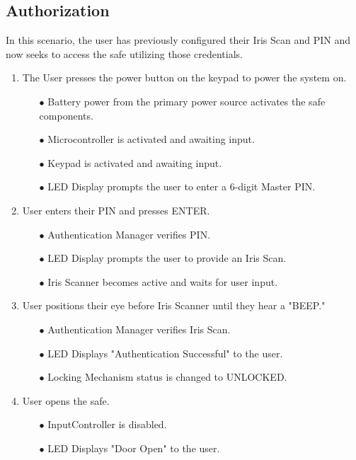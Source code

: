\documentclass{article}
\begin{document}
\subsection{Authorization}
In this scenario, the user has previously configured their Iris Scan and PIN and now seeks to access the safe utilizing those credentials.

\begin{enumerate}
    \item The User presses the power button on the keypad to power the system on.
    \begin{enumerate}
        \item[$\bullet$] Battery power from the primary power source activates the safe components.
        \item[$\bullet$] Microcontroller is activated and awaiting input.
        \item[$\bullet$] Keypad is activated and awaiting input.
        \item[$\bullet$] LED Display prompts the user to enter a 6-digit Master PIN.
    \end{enumerate}
    \item User enters their PIN and presses ENTER.
    \begin{enumerate}
        \item[$\bullet$] Authentication Manager verifies PIN.
        \item[$\bullet$] LED Display prompts the user to provide an Iris Scan.
        \item[$\bullet$] Iris Scanner becomes active and waits for user input.
    \end{enumerate}
    \item User positions their eye before Iris Scanner until they hear a "BEEP."
    \begin{enumerate}
        \item[$\bullet$] Authentication Manager verifies Iris Scan.
        \item[$\bullet$] LED Displays "Authentication Successful" to the user.
        \item[$\bullet$] Locking Mechanism status is changed to UNLOCKED.
    \end{enumerate}
    \item User opens the safe.
    \begin{enumerate}
        \item[$\bullet$] InputController is disabled.
        \item[$\bullet$] LED Displays "Door Open" to the user.

\end{enumerate}
\end{enumerate}
\end{document}
